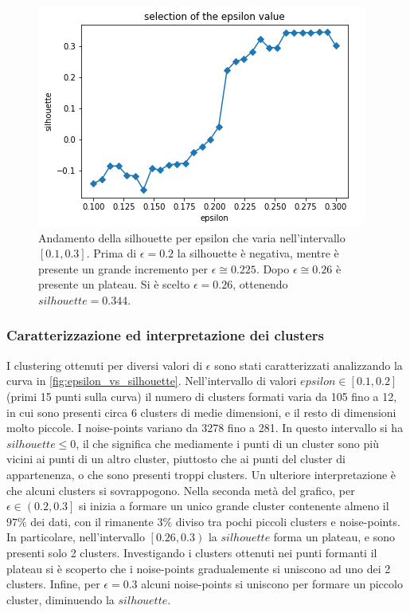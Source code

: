 \documentclass[a4paper]{article}
\begin{document}
\begin{figure}[hbtp]

\begin{minipage}[c]{0.6\textwidth}
\centering
\includegraphics[width=1\columnwidth]{../images/epsilon_vs_silhouette.png}
\end{minipage}
\hfill
\begin{minipage}[c]{0.4\textwidth}
\caption{Andamento della silhouette per epsilon che varia nell'intervallo $\left[0.1,0.3\right]$. Prima di $\epsilon=0.2$ la silhouette è negativa, mentre è presente un grande incremento per $\epsilon \cong 0.225$. Dopo $\epsilon \cong 0.26$ è presente un plateau. Si è scelto $\epsilon = 0.26$, ottenendo $silhouette=0.344$.}
\label{fig:epsilon_vs_silhouette}
\end{minipage}
\end{figure}

\subsubsection{Caratterizzazione ed interpretazione dei clusters}
I clustering ottenuti per diversi valori di $\epsilon$ sono stati caratterizzati analizzando la curva in  \autoref{fig:epsilon_vs_silhouette}.
Nell'intervallo di valori $epsilon \in \left[0.1, 0.2\right]$ (primi 15 punti sulla curva) il numero di clusters formati varia da 105 fino a 12, in cui sono presenti circa 6 clusters di medie dimensioni, e il resto di dimensioni molto piccole. I noise-points variano da 3278 fino a 281. In questo intervallo si ha $silhouette \leq 0$, il che significa che mediamente i punti di un cluster sono più vicini ai punti di un altro cluster, piuttosto che ai punti del cluster di appartenenza, o che sono presenti troppi clusters. Un ulteriore interpretazione è che alcuni clusters si sovrappogono.
Nella seconda metà del grafico, per $\epsilon \in \left(0.2, 0.3\right]$ si inizia a formare un unico grande cluster contenente almeno il $97\%$ dei dati, con il rimanente $3\%$ diviso tra pochi piccoli clusters e noise-points. 
In particolare, nell'intervallo $\left[0.26, 0.3\right)$ la $silhouette$ forma un plateau, e sono presenti solo 2 clusters. 
Investigando i clusters ottenuti nei punti formanti il plateau si è scoperto che i noise-points gradualemente si uniscono ad uno dei 2 clusters.
Infine, per $\epsilon=0.3$ alcuni noise-points si uniscono per formare un piccolo cluster, diminuendo la $silhouette$.
\end{document}
